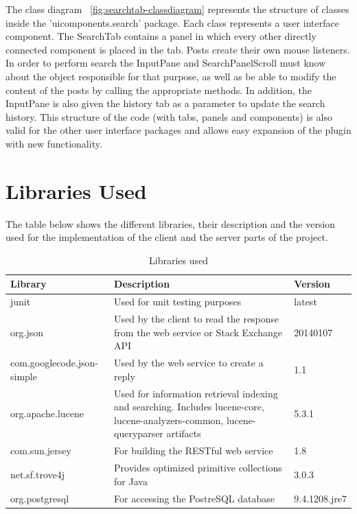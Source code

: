 \documentclass{l4proj}
\begin{document}
\noindent
The class diagram ~\ref{fig:searchtab-classdiagram} represents the structure of classes inside the 'uicomponents.search' package. Each class represents a user interface component. The SearchTab contains a panel  in which every other directly connected component is placed in the tab. Posts create their own mouse listeners. In order to perform search the InputPane and SearchPanelScroll must know about the object responsible for that purpose, as well as be able to modify the content of the posts by calling the appropriate methods. In addition, the InputPane is also given the history tab as a parameter to update the search history. This structure of the code (with tabs, panels and components) is also valid for the other user interface packages and allows easy expansion of the plugin with new functionality.

\newpage
\section{Libraries Used}

The table below shows the different libraries, their description and the version used for the implementation of the client and the server parts of the project.

\begin{table}[H]
\caption{Libraries used}
\centering
\def\arraystretch{1.5}
\begin{tabular}{p{4cm}p{9cm}p{2cm}}
\hline
Library & Description & Version \\
\hline
junit & Used for unit testing purposes & latest \\
org.json & Used by the client to read the response from the web service or Stack Exchange API & 20140107 \\
com.googlecode.json-simple & Used by the web service to create a reply & 1.1 \\
org.apache.lucene & Used for information retrieval indexing and searching. Includes lucene-core, lucene-analyzers-common, lucene-queryparser artifacts& 5.3.1 \\
com.sun.jersey & For building the RESTful web service & 1.8 \\
net.sf.trove4j & Provides optimized primitive collections for Java & 3.0.3 \\
org.postgresql & For accessing the PostreSQL database & 9.4.1208.jre7 \\
\hline
\end{tabular}
\label{table:librariesUsed}
\end{table}
\end{document}

